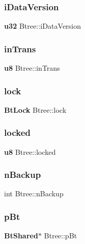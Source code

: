 \mbox{\label{struct_btree_a333e24a5c4340e94bad7aa13aa36ae31}} 
\subsubsection{iDataVersion}
{\footnotesize\ttfamily \textbf{ u32} Btree\+::i\+Data\+Version}

\mbox{\label{struct_btree_a50007448960c05dfd1fdc7db3e277685}} 
\subsubsection{inTrans}
{\footnotesize\ttfamily \textbf{ u8} Btree\+::in\+Trans}

\mbox{\label{struct_btree_a943ed8799c9943f753a88cf44f1632dc}} 
\subsubsection{lock}
{\footnotesize\ttfamily \textbf{ Bt\+Lock} Btree\+::lock}

\mbox{\label{struct_btree_a16fc8292bae9a66cfec03f6cb82d06a8}} 
\subsubsection{locked}
{\footnotesize\ttfamily \textbf{ u8} Btree\+::locked}

\mbox{\label{struct_btree_a7a3e7cf38bc9c3021a9e270a54ecfb1e}} 
\subsubsection{nBackup}
{\footnotesize\ttfamily int Btree\+::n\+Backup}

\mbox{\label{struct_btree_a63bab5d744d48d14368af048dddf2f20}} 
\subsubsection{pBt}
{\footnotesize\ttfamily \textbf{ Bt\+Shared}$\ast$ Btree\+::p\+Bt}

\mbox{\label{struct_btree_a9e6d2ca44c10ed8ef0be004225a74ef5}} 
